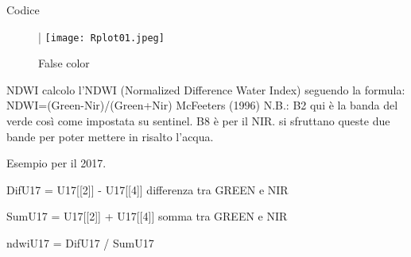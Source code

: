 \documentclass{beamer} %
\begin{document}
       \begin{frame}{Codice}
                            \begin{figure}
                            |
                             \texttt{[image: Rplot01.jpeg]}
                          \caption{False color}
                           \label{fig:enter-label}
                             \end{figure}



        \end{frame}
   
    \begin{frame}{NDWI}
           calcolo l'NDWI (Normalized Difference Water Index) seguendo la formula: 
       NDWI=(Green-Nir)/(Green+Nir)   McFeeters (1996)
      N.B.: B2 qui è la banda del verde così come impostata su sentinel. B8 è per il NIR. 
     si sfruttano queste due bande per poter mettere in risalto l'acqua. 
    

Esempio per il 2017.

DifU17 = U17[[2]] - U17[[4]] differenza tra GREEN e NIR


SumU17 = U17[[2]] + U17[[4]] somma tra GREEN e NIR

ndwiU17 = DifU17 / SumU17


          \end{frame}
       
       
\end{document}
